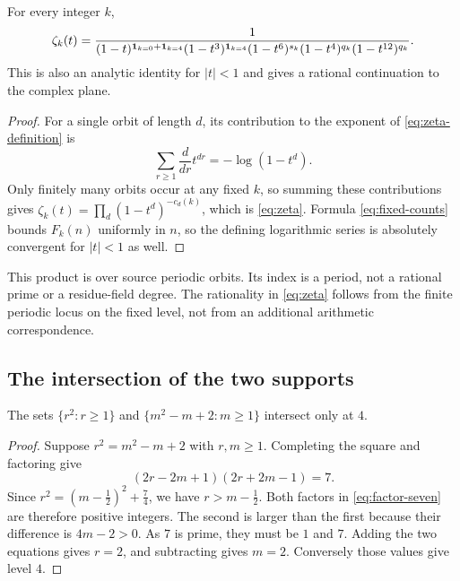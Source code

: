\begin{corollary}\label{cor:zeta}
For every integer $k$,
\begin{equation}\label{eq:zeta}
 \zeta_k(t)=
 \frac{1}{
 (1-t)^{\mathbf 1_{k=0}+\mathbf 1_{k=4}}
 (1-t^3)^{\mathbf 1_{k=4}}
 (1-t^6)^{s_k}
 (1-t^4)^{q_k}
 (1-t^{12})^{q_k}}.
\end{equation}
This is also an analytic identity for $|t|<1$ and gives a rational
continuation to the complex plane.
\end{corollary}
\begin{proof}
For a single orbit of length $d$, its contribution to the exponent
of \eqref{eq:zeta-definition} is
\[
 \sum_{r\geq1}\frac{d}{dr}t^{dr}
 =-\log(1-t^d).
\]
Only finitely many orbits occur at any fixed $k$, so summing these
contributions gives
$\zeta_k(t)=\prod_d(1-t^d)^{-c_d(k)}$, which is
\eqref{eq:zeta}. Formula \eqref{eq:fixed-counts} bounds $F_k(n)$
uniformly in $n$, so the defining logarithmic series is absolutely
convergent for $|t|<1$ as well.
\end{proof}

This product is over source periodic orbits. Its index is a period,
not a rational prime or a residue-field degree. The rationality in
\eqref{eq:zeta} follows from the finite periodic locus on the
fixed level, not from an additional arithmetic correspondence.

\subsection{The intersection of the two supports}

\begin{lemma}\label{lem:intersection}
The sets $\{r^2:r\geq1\}$ and
$\{m^2-m+2:m\geq1\}$ intersect only at $4$.
\end{lemma}
\begin{proof}
Suppose $r^2=m^2-m+2$ with $r,m\geq1$. Completing the square
and factoring give
\begin{equation}\label{eq:factor-seven}
 (2r-2m+1)(2r+2m-1)=7.
\end{equation}
Since $r^2=(m-\tfrac12)^2+\tfrac74$, we have
$r>m-\tfrac12$. Both factors in \eqref{eq:factor-seven} are
therefore positive integers. The second is larger than the first
because their difference is $4m-2>0$. As $7$ is prime, they
must be $1$ and $7$. Adding the two equations gives $r=2$,
and subtracting gives $m=2$. Conversely those values give level $4$.
\end{proof}

